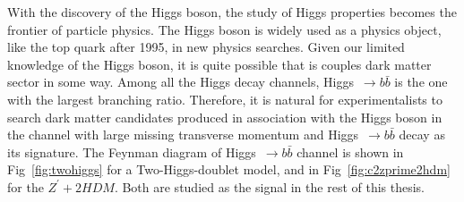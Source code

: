 \par With the discovery of the Higgs boson, the study of Higgs properties becomes the frontier of particle physics. The Higgs boson is widely used as a physics object, like the top quark after 1995, in new physics searches. Given our limited knowledge of the Higgs boson, it is quite possible that is couples dark matter sector in some way. Among all the Higgs decay channels, Higgs~$\rightarrow b\bar{b}$ is the one with the largest branching ratio. Therefore, it is natural for experimentalists to search dark matter candidates produced in association with the Higgs boson in the channel with large missing transverse momentum and Higgs~$\rightarrow b\bar{b}$ decay as its signature. The Feynman diagram of Higgs~$\rightarrow b\bar{b}$ channel is shown in Fig~\ref{fig:twohiggs} for a Two-Higgs-doublet model, and in Fig~\ref{fig:c2zprime2hdm} for the $Z^{\prime}+2HDM$. Both are studied as the signal in the rest of this thesis.

